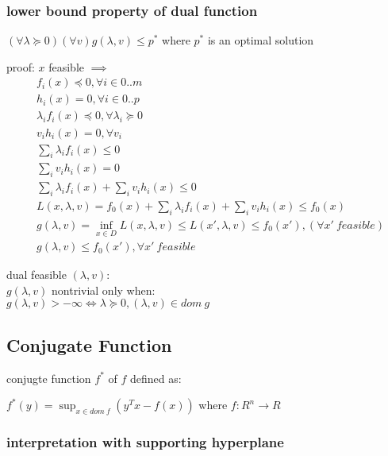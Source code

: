 \documentclass[8pt]{extarticle}
\begin{document}
\begin{multicols*}{2}
  \subsubsection{lower bound property of dual function}

  $(\forall \lambda \succeq 0) (\forall v) g(\lambda, v) \leq p^*$ where $p^*$ is an optimal solution

  proof:
  $x$ feasible $\implies$
  \begin{align*}
    &f_i(x) \preceq 0, \forall i \in 0..m\\
    &h_i(x) = 0, \forall i \in 0..p\\
    &\lambda_i f_i(x) \preceq 0, \forall \lambda_i \succeq 0\\
    &v_i h_i(x) = 0, \forall v_i\\
    &\sum_i \lambda_i f_i(x) \leq 0\\
    &\sum_i v_i h_i(x) = 0\\
    &\sum_i \lambda_i f_i(x) + \sum_i v_i h_i(x) \leq 0\\
    &L(x, \lambda, v) = f_0(x) + \sum_i \lambda_i f_i(x) + \sum_i v_i h_i(x) \leq f_0(x)\\
    &g(\lambda, v) = \inf_{x \in D} L(x, \lambda, v) \leq L(x', \lambda, v) \leq f_0(x'), (\forall x'\ feasible)\\
    &g(\lambda, v) \leq f_0(x'), \forall x'\ feasible
  \end{align*}

  dual feasible $(\lambda, v)$:\\
  $g(\lambda, v)$ nontrivial only when:\\
  $g(\lambda, v) > -\infty \iff \lambda \succeq 0, (\lambda, v) \in dom\ g$

  \vfill\null
  \columnbreak
    
  \subsection{Conjugate Function}

  conjugte function $f^*$ of $f$ defined as:

  $f^*(y) = \sup_{x \in dom\ f} (y^Tx - f(x))$ where $f: R^n \rightarrow R$

  \subsubsection{interpretation with supporting hyperplane}


\end{multicols*}
\end{document}
